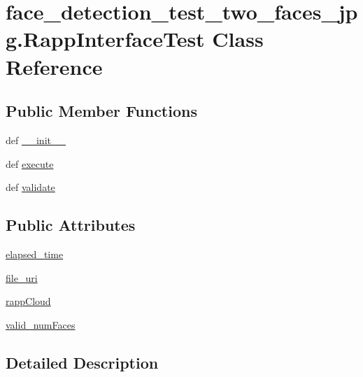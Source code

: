\hypertarget{classface__detection__test__two__faces__jpg_1_1RappInterfaceTest}{\section{face\-\_\-detection\-\_\-test\-\_\-two\-\_\-faces\-\_\-jpg.\-Rapp\-Interface\-Test Class Reference}
\label{classface__detection__test__two__faces__jpg_1_1RappInterfaceTest}
}
\subsection*{Public Member Functions}
\begin{DoxyCompactItemize}
\item 
def \hyperlink{classface__detection__test__two__faces__jpg_1_1RappInterfaceTest_a7f632975ee0ea5949603bd8603a5ce79}{\-\_\-\-\_\-init\-\_\-\-\_\-}
\item 
def \hyperlink{classface__detection__test__two__faces__jpg_1_1RappInterfaceTest_a18cf01421c002f645c8b9bb4d9d838be}{execute}
\item 
def \hyperlink{classface__detection__test__two__faces__jpg_1_1RappInterfaceTest_a336b3c19d540e81f4108baf870f32ac5}{validate}
\end{DoxyCompactItemize}
\subsection*{Public Attributes}
\begin{DoxyCompactItemize}
\item 
\hyperlink{classface__detection__test__two__faces__jpg_1_1RappInterfaceTest_af879b0ade674333058cc0bf0ce22f5dc}{elapsed\-\_\-time}
\item 
\hyperlink{classface__detection__test__two__faces__jpg_1_1RappInterfaceTest_a12cb8991a494c2af3182ec405aae300c}{file\-\_\-uri}
\item 
\hyperlink{classface__detection__test__two__faces__jpg_1_1RappInterfaceTest_a1a85c5f8347e9aaac93967f2e65d100b}{rapp\-Cloud}
\item 
\hyperlink{classface__detection__test__two__faces__jpg_1_1RappInterfaceTest_a4c7c23ce6f8de9ac9da2e75b89f83a02}{valid\-\_\-num\-Faces}
\end{DoxyCompactItemize}


\subsection{Detailed Description}


